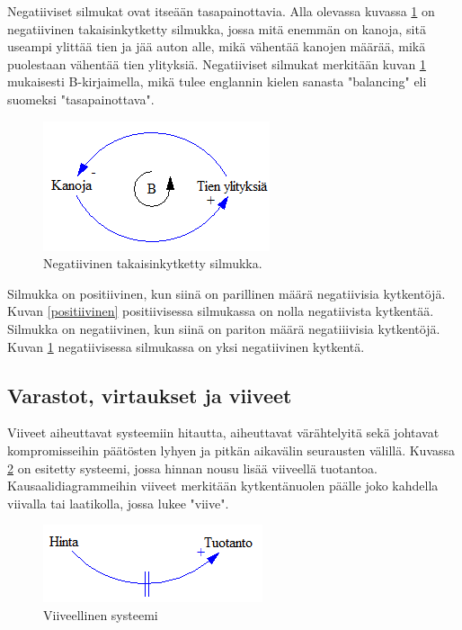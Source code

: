 \documentclass[finnish,12pt,a4paper,pdftex]{article}
\begin{document}
\begin{onehalfspacing}
Negatiiviset silmukat ovat itseään tasapainottavia. Alla olevassa kuvassa \ref{negatiivinen} on negatiivinen takaisinkytketty silmukka, jossa mitä enemmän on kanoja, sitä useampi ylittää tien ja jää auton alle, mikä vähentää kanojen määrää, mikä puolestaan vähentää tien ylityksiä. Negatiiviset silmukat merkitään kuvan \ref{negatiivinen} mukaisesti B-kirjaimella, mikä tulee englannin kielen sanasta "balancing" eli suomeksi "tasapainottava". \cite[s. 12--14]{Sterman2000}

\begin{figure}[H]
\centering \includegraphics{negatiivinen}
\caption{Negatiivinen takaisinkytketty silmukka. \cite[s. 13]{Sterman2000} \label{negatiivinen}}
\end{figure}

Silmukka on positiivinen, kun siinä on parillinen määrä negatiivisia kytkentöjä. Kuvan \ref{positiivinen} positiivisessa silmukassa on nolla negatiivista kytkentää. Silmukka on negatiivinen, kun siinä on pariton määrä negatiiivisia kytkentöjä. Kuvan \ref{negatiivinen} negatiivisessa silmukassa on yksi negatiivinen kytkentä. \cite[s. 12--14]{Sterman2000}

\subsection{Varastot, virtaukset ja viiveet \label{sysdyn:kausaali}}

Viiveet aiheuttavat systeemiin hitautta, aiheuttavat värähtelyitä sekä johtavat kompromisseihin päätösten lyhyen ja pitkän aikavälin seurausten välillä. Kuvassa \ref{viive} on esitetty systeemi, jossa hinnan nousu lisää viiveellä tuotantoa. Kausaalidiagrammeihin viiveet merkitään kytkentänuolen päälle joko kahdella viivalla tai laatikolla, jossa lukee "viive". \cite[s. 150--152]{Sterman2000} 

\begin{figure}[H]
\centering \includegraphics{viive}
\caption{Viiveellinen systeemi \cite[s. 150]{Sterman2000} \label{viive}}
\end{figure}



\end{onehalfspacing}
\end{document}
